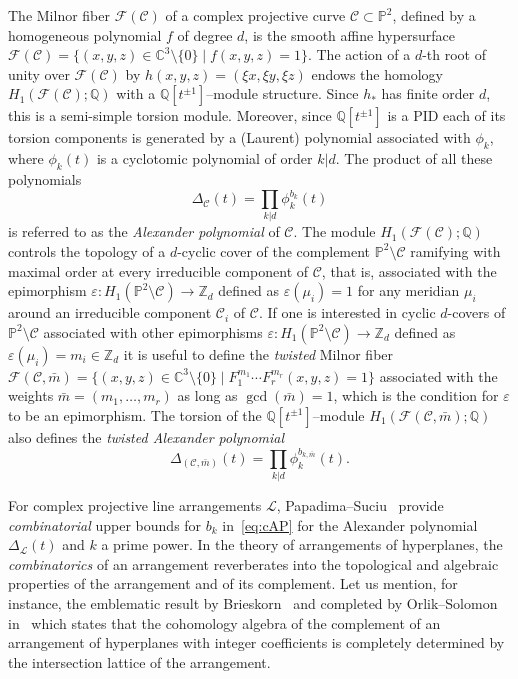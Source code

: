 \documentclass[11pt]{amsart}
\def\cC{\mathcal{C}}
\def\cL{\mathcal{L}}
\def\cF{\mathcal{F}}
\def\ZZ{\mathbb{Z}}
\def\QQ{\mathbb{Q}}
\def\PP{\mathbb{P}}
\theoremstyle{plain}
\theoremstyle{definition}
\begin{document}
The Milnor fiber $\cF(\cC)$ of a complex projective curve $\cC\subset \mathbb{P}^{2}$, defined by a homogeneous polynomial $f$ of degree $d$, is the smooth affine hypersurface $\cF(\cC)=\{(x,y,z)\in \mathbb{C}^{3}\setminus \{0\}\mid f(x,y,z)=1\}$. The action of a $d$-th root of unity over $\cF(\cC)$ by $h(x,y,z)=(\xi x,\xi y,\xi z)$ endows the homology $H_1(\cF(\cC);\QQ)$ with a $\QQ[t^{\pm 1}]$--module structure. Since $h_*$ has finite order $d$, this is a semi-simple torsion module. Moreover, since $\QQ[t^{\pm 1}]$ is a PID each of its torsion components is generated by a (Laurent) polynomial associated with $\phi_k$, where $\phi_k(t)$ is a cyclotomic polynomial of order $k|d$. The product of all these polynomials 
\begin{equation}
\label{eq:cAP}
\Delta_\cC(t)=\prod_{k|d} \phi_k^{b_k}(t)
\end{equation}
is referred to as the \emph{Alexander polynomial} of $\cC$. The module $H_1(\cF(\cC);\QQ)$ controls the topology of a $d$-cyclic cover of the complement $\PP^2\setminus \cC$ ramifying with maximal order at every irreducible component of $\cC$, that is, associated with the epimorphism $\varepsilon:H_1(\PP^2\setminus \cC)\to\ZZ_d$ defined as $\varepsilon(\mu_i)=1$ for any meridian $\mu_i$ around an irreducible component $\cC_i$ of $\cC$. If one is interested in cyclic $d$-covers of $\PP^2\setminus \cC$ associated with other epimorphisms $\varepsilon:H_1(\PP^2\setminus \cC)\to\ZZ_d$ defined as $\varepsilon(\mu_i)=m_i\in\ZZ_d$ it is useful to define the \emph{twisted} Milnor fiber $\cF(\cC,\bar m)=\{(x,y,z)\in \mathbb{C}^{3}\setminus \{0\}\mid F_1^{m_1}\cdots F_r^{m_r}(x,y,z)=1\}$ associated with the weights $\bar m=(m_1,\dots,m_r)$ as long as $\gcd(\bar m)=1$, which is the condition for $\varepsilon$ to be an epimorphism.
The torsion of the $\QQ[t^{\pm 1}]$--module $H_1(\cF(\cC,\bar m);\QQ)$
also defines the \emph{twisted Alexander polynomial} 
\begin{equation}
\label{eq:twAP}
\Delta_{(\mathcal{C},\bar m)}(t)=\prod_{k|d} \phi_k^{b_{k,\bar m}}(t).
\end{equation}

For complex projective line arrangements $\cL$, Papadima--Suciu~\cite{PS2} provide {\it combinatorial} upper bounds for 
$b_k$ in~\eqref{eq:cAP} for the Alexander polynomial $\Delta_{\cL}(t)$ and $k$ a prime power. In the theory of arrangements of hyperplanes, the {\it combinatorics} of an arrangement reverberates into the topological and algebraic properties of the arrangement and of its complement. Let us mention, for instance, the emblematic result by Brieskorn~\cite{Brieskorn-tresses} and completed by Orlik--Solomon in~\cite{OS} which states that the cohomology algebra of the complement of an arrangement of hyperplanes with integer coefficients is completely determined by the intersection lattice of the arrangement.
\end{document}
